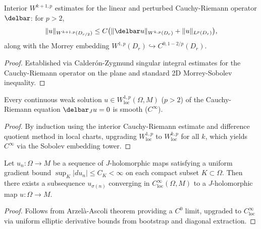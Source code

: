 \begin{lemma}
\label{a04:elliptic_toolkit}
\leanok
{}
Interior $W^{k+1, p}$ estimates for the linear and perturbed Cauchy-Riemann operator $\delbar$: for $p > 2$,
\[
\|u\|_{W^{k+1, p}(D_{r/2})} \le C\big(\|\delbar u\|_{W^{k, p}(D_r)} + \|u\|_{L^p(D_r)}\big),
\]
along with the Morrey embedding $W^{1, p}(D_r) \hookrightarrow C^{0, 1 - 2/p}(D_r)$.
\end{lemma}
\begin{proof}
Established via Calder\'on-Zygmund singular integral estimates for the Cauchy-Riemann operator on the plane and standard 2D Morrey-Sobolev inequality.
\end{proof}

\begin{theorem}
\label{a05:bootstrap}
\leanok
{}
Every continuous weak solution $u \in W^{1, p}_{\mathrm{loc}}(\Omega, M)$ ($p > 2$) of the Cauchy-Riemann equation $\delbar_J u = 0$ is smooth ($C^\infty$).
\end{theorem}
\begin{proof}
By induction using the interior Cauchy-Riemann estimate and difference quotient method in local charts, upgrading $W^{1, p}_{\mathrm{loc}}$ to $W^{k, p}_{\mathrm{loc}}$ for all $k$, which yields $C^\infty$ via the Sobolev embedding tower.
\end{proof}

\begin{theorem}
\label{a06:local_compactness}
\leanok
{}
Let $u_n : \Omega \to M$ be a sequence of $J$-holomorphic maps satisfying a uniform gradient bound $\sup_{K} |du_n| \le C_K < \infty$ on each compact subset $K \subset \Omega$. Then there exists a subsequence $u_{\sigma(n)}$ converging in $C^\infty_{\mathrm{loc}}(\Omega, M)$ to a $J$-holomorphic map $u : \Omega \to M$.
\end{theorem}
\begin{proof}
Follows from Arzel\`a-Ascoli theorem providing a $C^0$ limit, upgraded to $C^\infty_{\mathrm{loc}}$ via uniform elliptic derivative bounds from bootstrap and diagonal extraction.
\end{proof}

